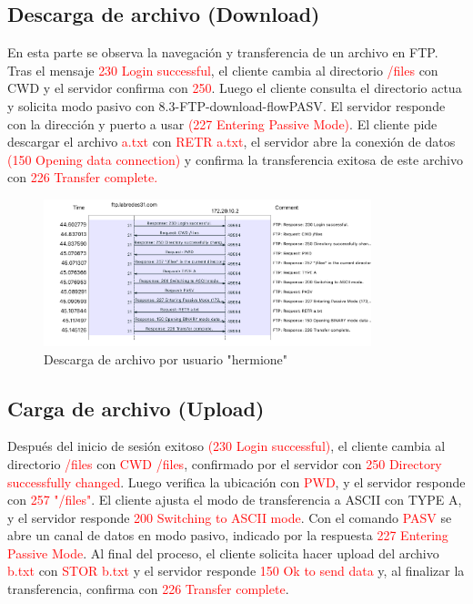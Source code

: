 \documentclass[10pt]{article}
\begin{document}
\subsection{Descarga de archivo (Download)}
En esta parte se observa la navegación y transferencia de un archivo en FTP. Tras el mensaje \textcolor{red}{230 Login successful}, el cliente cambia al directorio \textcolor{red}{/files} con CWD y el servidor confirma con \textcolor{red}{250}. Luego el cliente consulta el directorio actua y solicita modo pasivo con 8.3-FTP-download-flow{PASV}. El servidor responde con la dirección y puerto a usar \textcolor{red}{(227 Entering Passive Mode)}. El cliente pide descargar el archivo \textcolor{red}{a.txt} con \textcolor{red}{RETR a.txt}, el servidor abre la conexión de datos \textcolor{red}{(150 Opening data connection)} y confirma la transferencia exitosa de este archivo con \textcolor{red}{226 Transfer complete.}

\begin{figure}[H]
    \centering
    \includegraphics[width=0.85\textwidth]{lab-02-screenshots/8.3-FTP-download-flow}
    \caption{Descarga de archivo por usuario "hermione"}
\end{figure}

\subsection{Carga de archivo (Upload)}
Después del inicio de sesión exitoso \textcolor{red}{(230 Login successful)}, el cliente cambia al directorio \textcolor{red}{/files} con \textcolor{red}{CWD /files}, confirmado por el servidor con \textcolor{red}{250 Directory successfully changed}. Luego verifica la ubicación con \textcolor{red}{PWD}, y el servidor responde con \textcolor{red}{257 "/files"}. El cliente ajusta el modo de transferencia a ASCII con TYPE A, y el servidor responde \textcolor{red}{200 Switching to ASCII mode}. Con el comando \textcolor{red}{PASV} se abre un canal de datos en modo pasivo, indicado por la respuesta \textcolor{red}{227 Entering Passive Mode}. Al final del proceso, el cliente solicita hacer upload del archivo \textcolor{red}{b.txt} con \textcolor{red}{STOR b.txt} y el servidor responde \textcolor{red}{150 Ok to send data} y, al finalizar la transferencia, confirma con \textcolor{red}{226 Transfer complete}.
\end{document}

